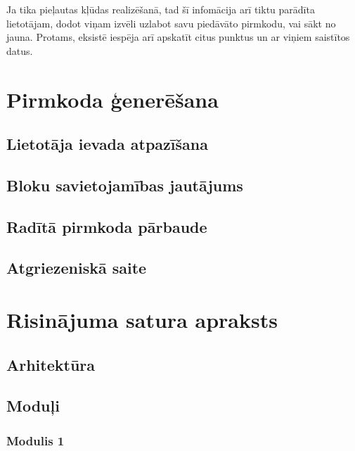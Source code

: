 Ja tika pieļautas kļūdas realizēšanā, tad šī infomācija arī tiktu parādīta lietotājam, dodot viņam izvēli uzlabot savu piedāvāto pirmkodu, vai sākt no jauna. Protams, eksistē iespēja arī apskatīt citus punktus un ar viņiem saistītos datus.

\section{Pirmkoda ģenerēšana}

\subsection{Lietotāja ievada atpazīšana}

\subsection{Bloku savietojamības jautājums}

\subsection{Radītā pirmkoda pārbaude}

\subsection{Atgriezeniskā saite}

\section{Risinājuma satura apraksts}

\subsection{Arhitektūra}

\subsection{Moduļi}

\subsubsection{Modulis 1}